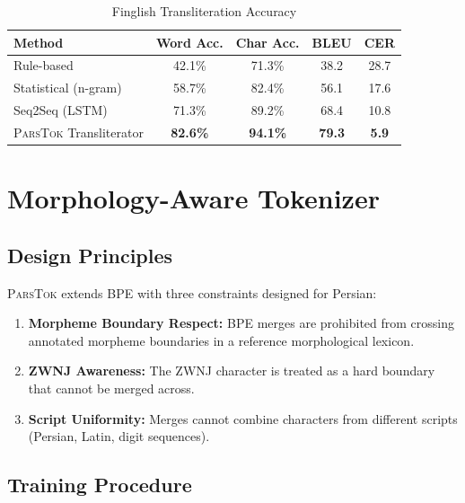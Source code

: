 \documentclass[11pt,a4paper]{article}
\newcommand{\parstok}{\textsc{ParsTok}\xspace}
\begin{document}
\begin{table}[H]
\centering
\caption{Finglish Transliteration Accuracy}
\label{tab:finglish-acc}
\begin{tabular}{lcccc}
\toprule
\textbf{Method} & \textbf{Word Acc.} & \textbf{Char Acc.} & \textbf{BLEU} & \textbf{CER} \\
\midrule
Rule-based & 42.1\% & 71.3\% & 38.2 & 28.7 \\
Statistical (n-gram) & 58.7\% & 82.4\% & 56.1 & 17.6 \\
Seq2Seq (LSTM) & 71.3\% & 89.2\% & 68.4 & 10.8 \\
\parstok Transliterator & \textbf{82.6\%} & \textbf{94.1\%} & \textbf{79.3} & \textbf{5.9} \\
\bottomrule
\end{tabular}
\end{table}

\section{Morphology-Aware Tokenizer}

\subsection{Design Principles}

\parstok extends BPE with three constraints designed for Persian:

\begin{enumerate}
    \item \textbf{Morpheme Boundary Respect:} BPE merges are prohibited from crossing annotated morpheme boundaries in a reference morphological lexicon.
    \item \textbf{ZWNJ Awareness:} The ZWNJ character is treated as a hard boundary that cannot be merged across.
    \item \textbf{Script Uniformity:} Merges cannot combine characters from different scripts (Persian, Latin, digit sequences).
\end{enumerate}

\subsection{Training Procedure}
\end{document}
